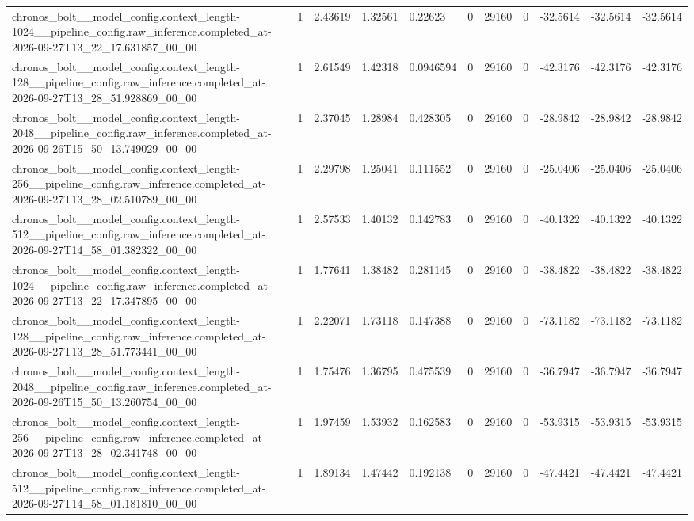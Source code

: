 \begin{tabular}{lllllllllll}
chronos\_bolt\_\_model\_config.context\_length-1024\_\_pipeline\_config.raw\_inference.completed\_at-2026-09-27T13\_22\_17.631857\_00\_00 & 1 & 2.43619 & 1.32561 & 0.22623 & 0 & 29160 & 0 & -32.5614 & -32.5614 & -32.5614 \\
chronos\_bolt\_\_model\_config.context\_length-128\_\_pipeline\_config.raw\_inference.completed\_at-2026-09-27T13\_28\_51.928869\_00\_00 & 1 & 2.61549 & 1.42318 & 0.0946594 & 0 & 29160 & 0 & -42.3176 & -42.3176 & -42.3176 \\
chronos\_bolt\_\_model\_config.context\_length-2048\_\_pipeline\_config.raw\_inference.completed\_at-2026-09-26T15\_50\_13.749029\_00\_00 & 1 & 2.37045 & 1.28984 & 0.428305 & 0 & 29160 & 0 & -28.9842 & -28.9842 & -28.9842 \\
chronos\_bolt\_\_model\_config.context\_length-256\_\_pipeline\_config.raw\_inference.completed\_at-2026-09-27T13\_28\_02.510789\_00\_00 & 1 & 2.29798 & 1.25041 & 0.111552 & 0 & 29160 & 0 & -25.0406 & -25.0406 & -25.0406 \\
chronos\_bolt\_\_model\_config.context\_length-512\_\_pipeline\_config.raw\_inference.completed\_at-2026-09-27T14\_58\_01.382322\_00\_00 & 1 & 2.57533 & 1.40132 & 0.142783 & 0 & 29160 & 0 & -40.1322 & -40.1322 & -40.1322 \\
chronos\_bolt\_\_model\_config.context\_length-1024\_\_pipeline\_config.raw\_inference.completed\_at-2026-09-27T13\_22\_17.347895\_00\_00 & 1 & 1.77641 & 1.38482 & 0.281145 & 0 & 29160 & 0 & -38.4822 & -38.4822 & -38.4822 \\
chronos\_bolt\_\_model\_config.context\_length-128\_\_pipeline\_config.raw\_inference.completed\_at-2026-09-27T13\_28\_51.773441\_00\_00 & 1 & 2.22071 & 1.73118 & 0.147388 & 0 & 29160 & 0 & -73.1182 & -73.1182 & -73.1182 \\
chronos\_bolt\_\_model\_config.context\_length-2048\_\_pipeline\_config.raw\_inference.completed\_at-2026-09-26T15\_50\_13.260754\_00\_00 & 1 & 1.75476 & 1.36795 & 0.475539 & 0 & 29160 & 0 & -36.7947 & -36.7947 & -36.7947 \\
chronos\_bolt\_\_model\_config.context\_length-256\_\_pipeline\_config.raw\_inference.completed\_at-2026-09-27T13\_28\_02.341748\_00\_00 & 1 & 1.97459 & 1.53932 & 0.162583 & 0 & 29160 & 0 & -53.9315 & -53.9315 & -53.9315 \\
chronos\_bolt\_\_model\_config.context\_length-512\_\_pipeline\_config.raw\_inference.completed\_at-2026-09-27T14\_58\_01.181810\_00\_00 & 1 & 1.89134 & 1.47442 & 0.192138 & 0 & 29160 & 0 & -47.4421 & -47.4421 & -47.4421 \\

\end{tabular}
